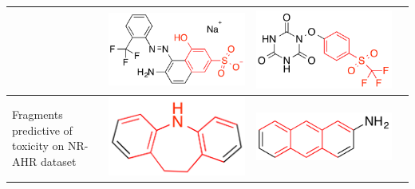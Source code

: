 \documentclass[landscape,a0b,final,a4resizeable]{include/a0poster}
\begin{document}
\begin{poster}
\begin{multicols}{3}
\begin{center}
\begin{tabular}{>{\centering}m{\mywidthb} >{\centering}m{\mywidtha} >{\centering}m{\mywidtha} >{\centering\arraybackslash}m{\mywidtha}}
& \includegraphics[width=\mywidtha]{figures/jorge-figures/8.png}
& \includegraphics[width=\mywidtha]{figures/jorge-figures/9.png}\\
\midrule
\vspace{0.5in}
Fragments predictive of toxicity on NR-AHR dataset
\vspace{0.5in}
& \includegraphics[width=6.5cm]{figures/jorge-figures/10.png} 
& \includegraphics[width=\mywidtha]{figures/jorge-figures/11.png}

\end{tabular}
\end{center}
\end{multicols}
\end{poster}
\end{document}
